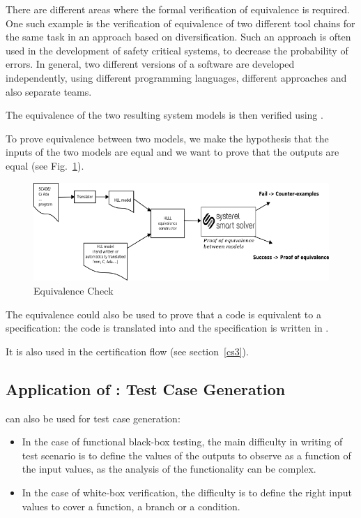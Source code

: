 There are different areas where the formal verification of equivalence is
required. One such example is the verification of equivalence of two different
tool chains for the same task in an approach based on diversification. Such an
approach is often used in the development of safety critical systems, to
decrease the probability of errors. In general,  two different
versions of a software are developed independently, using different programming languages, different
approaches and also separate teams.

The equivalence of the two resulting system models is then verified using
\smartsolver{}. 

To prove equivalence between two \HLL{} models, we make the hypothesis
that the inputs of the two \HLL{} models are equal and we want to prove
that the outputs are equal (see Fig.~\ref{fig:s3-equiv-check}).


\begin{figure}[h]
  \centering
  \includegraphics[width=1\textwidth]{figures/s3equiv}
  \caption{Equivalence Check}
  \label{fig:s3-equiv-check}
\end{figure}


The equivalence could also be used to prove that a code is equivalent to
a specification: the code is translated into \HLL{} and the
specification is written in \HLL{}.

It is also used in the certification flow (see section~\ref{cs3}).


\subsection{Application of \smartsolver{}: Test Case Generation}
\label{sec:test-case}

\smartsolver{} can also be used for test case generation:
\begin{itemize}
\item In the case of functional black-box testing, the main difficulty in writing of test scenario is to  define the values of the outputs to observe as a function of the input values, as the analysis of the functionality can be complex.
\item In the case of white-box verification, the difficulty is to define the right input values to cover a function, a branch or a condition.
\end{itemize} 



